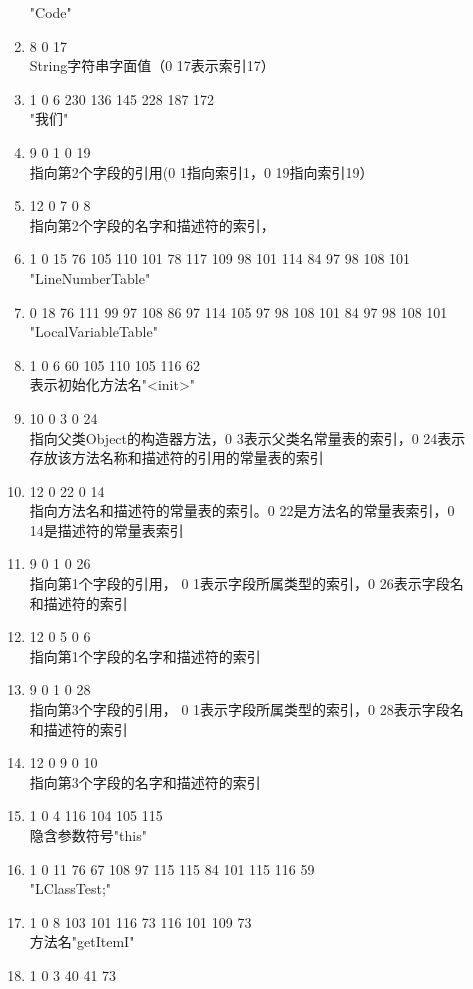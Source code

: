 \begin{description}
\begin{enumerate}
		"Code"
	\item 8 0 17\\
		String字符串字面值（0 17表示索引17）
	\item 1 0 6 230 136 145 228 187 172\\
		"我们"
	\item 9 0 1 0 19\\
		指向第2个字段的引用(0 1指向索引1，0 19指向索引19）
	\item 12 0 7 0 8\\
		指向第2个字段的名字和描述符的索引，
	\item 1 0 15 76 105 110 101 78 117 109 98 101 114 84 97 98 108 101\\
		"LineNumberTable"
	\item 0 18 76 111 99 97 108 86 97 114 105 97 98 108 101 84 97 98 108 101\\
		"LocalVariableTable"
	\item 1 0 6 60 105 110 105 116 62\\
		表示初始化方法名"<init>"
	\item 10 0 3 0 24\\
		指向父类Object的构造器方法，0 3表示父类名常量表的索引，0 24表示存放该方法名称和描述符的引用的常量表的索引
	\item 12 0 22 0 14\\
		指向方法名和描述符的常量表的索引。0 22是方法名的常量表索引，0 14是描述符的常量表索引
	\item 9 0 1 0 26\\
		指向第1个字段的引用， 0 1表示字段所属类型的索引，0 26表示字段名和描述符的索引
	\item 12 0 5 0 6\\
		指向第1个字段的名字和描述符的索引
	\item 9 0 1 0 28\\
		指向第3个字段的引用， 0 1表示字段所属类型的索引，0 28表示字段名和描述符的索引
	\item 12 0 9 0 10\\
		指向第3个字段的名字和描述符的索引
	\item 1 0 4 116 104 105 115\\
		隐含参数符号"this"
	\item 1 0 11 76 67 108 97 115 115 84 101 115 116 59\\
		"LClassTest;"
	\item 1 0 8 103 101 116 73 116 101 109 73\\
		方法名"getItemI"
	\item 1 0 3 40 41 73\\

\end{enumerate}
\end{description}
